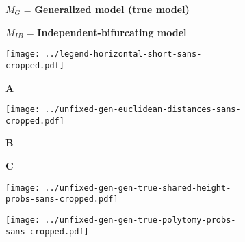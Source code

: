 \documentclass[border=10pt,varwidth=30cm]{standalone}
\begin{document}
\begin{figure}
    \centering
    \begin{subfigure}[c][][c]{0.49\textwidth}
        \centering
        \huge {\Huge $M_{G}$} = \textbf{Generalized model (true model)}
    \end{subfigure}
    \hfill
    \begin{subfigure}[c][][c]{0.49\textwidth}
        \centering
        \huge {\Huge $M_{IB}$} = \textbf{Independent-bifurcating model}
    \end{subfigure}
    \vspace{2mm}
    \begin{subfigure}[c][][c]{\textwidth}
        \centering
        \texttt{[image: ../legend-horizontal-short-sans-cropped.pdf]}
    \end{subfigure}
    \vspace{2mm}
    \begin{subfigure}[b][][l]{\textwidth}
        \Huge \textbf{A}
    \end{subfigure}
    \begin{subfigure}[c][][c]{\textwidth}
        \centering
        \texttt{[image: ../unfixed-gen-euclidean-distances-sans-cropped.pdf]}
    \end{subfigure}
    \begin{subfigure}[b][][l]{0.49\textwidth}
        \Huge \textbf{B}
    \end{subfigure}
    \hfill
    \begin{subfigure}[b][][l]{0.49\textwidth}
        \Huge \textbf{C}
    \end{subfigure}
    \begin{subfigure}[c][][c]{0.49\textwidth}
        \centering
        \texttt{[image: ../unfixed-gen-gen-true-shared-height-probs-sans-cropped.pdf]}
        \label{fig:gentree}
    \end{subfigure}
    \hfill
    \begin{subfigure}[c][][c]{0.49\textwidth}
        \centering
        \texttt{[image: ../unfixed-gen-gen-true-polytomy-probs-sans-cropped.pdf]}
    \end{subfigure}
\end{figure}
\end{document}
